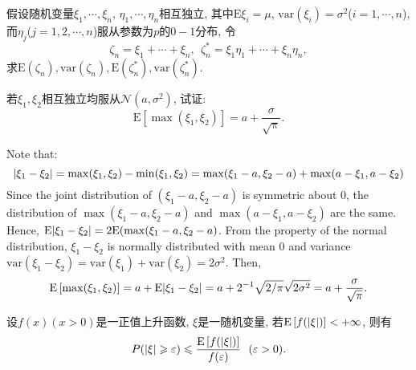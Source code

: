\begin{yyEx}
	假设随机变量$\xi_1,\cdots,\xi_n$, $\eta_1,\cdots,\eta_n$相互独立, 其中$\mathrm{E}\xi_i=\mu$, $\mathrm{var}(\xi_i)=\sigma^2$($i=1,\cdots,n$), 而$\eta_j$($j=1,2,\cdots,n$)服从参数为$p$的$0-1$分布, 令
	\begin{equation}
	\zeta_n = \xi_1+\cdots+\xi_n,~~\zeta_n^* = \xi_1\eta_1+\cdots+\xi_n\eta_n,
	\end{equation}
	求$\mathrm{E}(\zeta_n),\mathrm{var}(\zeta_n),\mathrm{E}(\zeta_n^*),\mathrm{var}(\zeta_n^*)$.
\end{yyEx}

\begin{yyEx}
	若$\xi_1,\xi_2$相互独立均服从$\mathcal{N}(a,\sigma^2)$, 试证:
	\begin{equation}
	\mathrm{E}\left[ \max(\xi_1,\xi_2) \right] = a+\frac{\sigma}{\sqrt{\mathrm{\pi}}}.
	\end{equation}
\end{yyEx}
	\begin{yyProof}
	Note that:
	\begin{equation}
	\lvert\xi_1-\xi_2\rvert = \max(\xi_1,\xi_2)-\min(\xi_1,\xi_2) = \max(\xi_1-a,\xi_2-a)+\max(a-\xi_1,a-\xi_2)
	\end{equation}
	Since the joint distribution of $(\xi_1-a,\xi_2-a)$ is symmetric about $0$, the distribution of $\max(\xi_1-a,\xi_2-a)$ and $\max(a-\xi_1,a-\xi_2)$ are the same. Hence, $\mathrm{E}\lvert\xi_1-\xi_2\rvert = 2\mathrm{E}(\max(\xi_1-a,\xi_2-a)$. From the property of the normal distribution, $\xi_1-\xi_2$ is normally distributed with mean $0$ and variance $\mathrm{var}(\xi_1-\xi_2) = \mathrm{var}(\xi_1)+\mathrm{var}(\xi_2) = 2\sigma^2$. Then,
	\begin{equation}
	\mathrm{E}\left[ \max(\xi_1,\xi_2) \right] = a+\mathrm{E}\lvert\xi_1-\xi_2\rvert = a+ 2^{-1}\sqrt{2/\mathrm{\pi}}\sqrt{2\sigma^2} = a+\frac{\sigma}{\sqrt{\mathrm{\pi}}}.
	\end{equation}
\end{yyProof}

\begin{yyEx}
	设$f(x)(x>0)$是一正值上升函数, $\xi$是一随机变量, 若$\mathrm{E}\left[ f(\lvert\xi\rvert) \right] < +\infty$, 则有
	\begin{equation}
	P(\lvert\xi\rvert\geqslant \varepsilon)\leqslant\frac{\mathrm{E}\left[ f(\lvert\xi\rvert) \right]}{f(\varepsilon)}~~(\varepsilon>0).
	\end{equation}
\end{yyEx}

